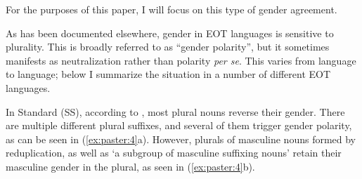 \documentclass[output=paper,modfonts]{langscibook}
\begin{document}

For the purposes of this paper, I will focus on this type of gender agreement. 

As has been documented elsewhere, gender in EOT languages is sensitive to plurality. This is broadly referred to as “gender polarity”, but it sometimes manifests as neutralization rather than polarity \textit{per se}. This varies from language to language; below I summarize the situation in a number of different EOT languages.

In Standard  (SS), according to \citet[54--55]{Saeed1999}, most plural nouns reverse their gender. There are multiple different plural suffixes, and several of them trigger gender polarity, as can be seen in (\ref{ex:paster:4}a). However, plurals of masculine nouns formed by reduplication, as well as ‘a subgroup of masculine suffixing nouns’ retain their masculine gender in the plural, as seen in (\ref{ex:paster:4}b).
\end{document}
